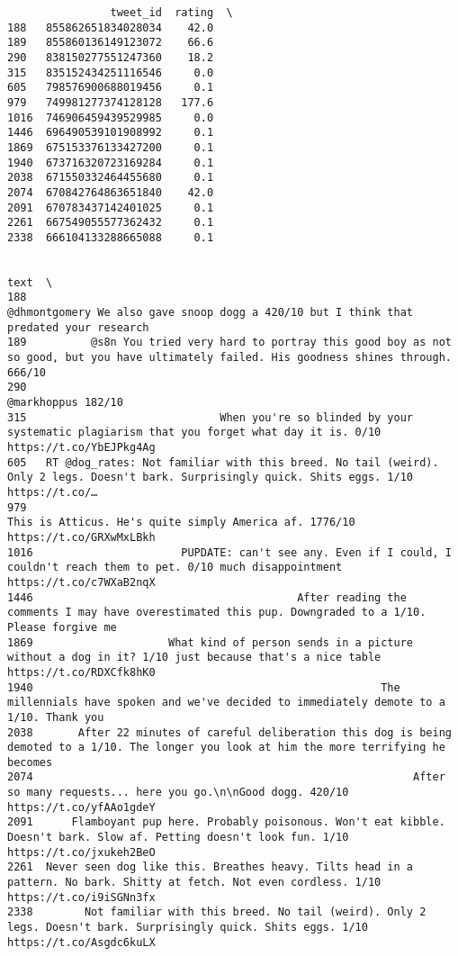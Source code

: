 \documentclass[11pt]{article}
\begin{document}
    
    \begin{verbatim}
                tweet_id  rating  \
188   855862651834028034    42.0   
189   855860136149123072    66.6   
290   838150277551247360    18.2   
315   835152434251116546     0.0   
605   798576900688019456     0.1   
979   749981277374128128   177.6   
1016  746906459439529985     0.0   
1446  696490539101908992     0.1   
1869  675153376133427200     0.1   
1940  673716320723169284     0.1   
2038  671550332464455680     0.1   
2074  670842764863651840    42.0   
2091  670783437142401025     0.1   
2261  667549055577362432     0.1   
2338  666104133288665088     0.1   

                                                                                                                                              text  \
188                                                         @dhmontgomery We also gave snoop dogg a 420/10 but I think that predated your research   
189          @s8n You tried very hard to portray this good boy as not so good, but you have ultimately failed. His goodness shines through. 666/10   
290                                                                                                                             @markhoppus 182/10   
315                              When you're so blinded by your systematic plagiarism that you forget what day it is. 0/10 https://t.co/YbEJPkg4Ag   
605   RT @dog_rates: Not familiar with this breed. No tail (weird). Only 2 legs. Doesn't bark. Surprisingly quick. Shits eggs. 1/10 https://t.co/…   
979                                                                 This is Atticus. He's quite simply America af. 1776/10 https://t.co/GRXwMxLBkh   
1016                       PUPDATE: can't see any. Even if I could, I couldn't reach them to pet. 0/10 much disappointment https://t.co/c7WXaB2nqX   
1446                                         After reading the comments I may have overestimated this pup. Downgraded to a 1/10. Please forgive me   
1869                     What kind of person sends in a picture without a dog in it? 1/10 just because that's a nice table https://t.co/RDXCfk8hK0   
1940                                                      The millennials have spoken and we've decided to immediately demote to a 1/10. Thank you   
2038       After 22 minutes of careful deliberation this dog is being demoted to a 1/10. The longer you look at him the more terrifying he becomes   
2074                                                           After so many requests... here you go.\n\nGood dogg. 420/10 https://t.co/yfAAo1gdeY   
2091      Flamboyant pup here. Probably poisonous. Won't eat kibble. Doesn't bark. Slow af. Petting doesn't look fun. 1/10 https://t.co/jxukeh2BeO   
2261  Never seen dog like this. Breathes heavy. Tilts head in a pattern. No bark. Shitty at fetch. Not even cordless. 1/10 https://t.co/i9iSGNn3fx   
2338        Not familiar with this breed. No tail (weird). Only 2 legs. Doesn't bark. Surprisingly quick. Shits eggs. 1/10 https://t.co/Asgdc6kuLX   


\end{verbatim}
\end{document}
